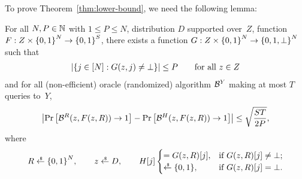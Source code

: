 \noindent
To prove Theorem~\ref{thm:lower-bound}, we need the following lemma:

\begin{lemma}\label{lem:ai-rom}
For all ${N,P\in{\mathbb{N}}}$ with ${1\leq P\leq N}$,
distribution $D$ supported over~$Z$,
function ${F:Z\times{\{0,1\}}^N\to{\{0,1\}}^S}$,
there exists a function ${G:Z\times\bit^N\to{\{0,1,\bot\}}^N}$ such that
\begin{align*}
|\{{j\in[N]}:{G(z,j)\neq\bot}\}|\leq P
\qquad\textup{for all }z\in Z
\end{align*}
and for all (non-efficient) oracle (randomized) algorithm ${\mathcal{B}}^Y$ making at most $T$ queries to~$Y$,
\begin{align*}
\left|
\Pr\left[{\mathcal{B}}^R(z,F(z,R))\to 1\right]
-
\Pr\left[{\mathcal{B}}^H(z,F(z,R))\to 1\right]
\right|
\leq
\sqrt{\frac{ST}{2P}},
\end{align*}
where
\begin{align*}
R\draws\bit^N,\qquad
z\draws D,\qquad
H[j]\begin{cases}
=G(z,R)[j],&\textup{if }G(z,R)[j]\neq\bot;\\
\draws\bit,&\textup{if }G(z,R)[j]=\bot.
\end{cases}
\end{align*}
\end{lemma}

